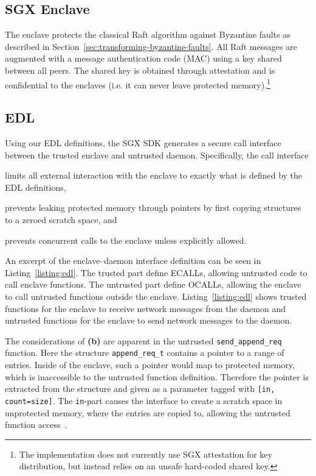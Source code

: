 \documentclass{article}
\begin{document}
	\subsection{SGX Enclave}
	The enclave protects the classical Raft algorithm against Byzantine faults as described in Section~\ref{sec:transforming-byzantine-faults}.
	All Raft messages are augmented with a message authentication code (MAC) using a key shared between all peers.
	The shared key is obtained through attestation and is confidential to the enclaves (i.e. it can never leave protected memory).\footnote{The implementation does not currently use SGX attestation for key distribution, but instead relies on an unsafe hard-coded shared key.}

	\subsection{EDL}
	Using our EDL definitions, the SGX SDK generates a secure call interface between the trusted enclave and untrusted daemon.
	Specifically, the call interface
	\begin{enumerate*}[label=\textbf{(\alph*)}]
		\item limits all external interaction with the enclave to exactly what is defined by the EDL definitions,
		\item prevents leaking protected memory through pointers by first copying structures to a zeroed scratch space, and
		\item prevents concurrent calls to the enclave unless explicitly allowed.
	\end{enumerate*}

	An excerpt of the enclave--daemon interface definition can be seen in Listing~\ref{listing:edl}.
	The trusted part define ECALLs, allowing untrusted code to call enclave functions.
	The untrusted part define OCALLs, allowing the enclave to call untrusted functions outside the enclave.
	Listing~\ref{listing:edl} shows trusted functions for the enclave to receive network messages from the daemon and untrusted functions for the enclave to send network messages to the daemon.

	The considerations of \textbf{(b)} are apparent in the untrusted \texttt{send\_append\_req} function.
	Here the structure \texttt{append\_req\_t} contains a pointer to a range of entries.
	Inside of the enclave, such a pointer would map to protected memory, which is inaccessible to the untrusted function definition.
	Therefore the pointer is extracted from the structure and given as a parameter tagged with \texttt{[in, count=size]}.
	The \texttt{in}-part causes the interface to create a scratch space in unprotected memory, where the entries are copied to, allowing the untrusted function access~\cite{intel_sgx_developer_reference}.
\end{document}
